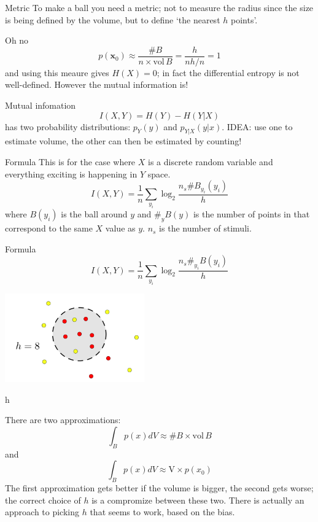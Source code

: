\documentclass{beamer}
\begin{document}
\begin{frame}{Metric}
To make a ball you need a metric; not to measure the radius since the
size is being defined by the volume, but to define \lq{}the nearest
$h$ points\rq{}.
\color{reddish}
\begin{center}
\color{reddish}

\end{center}
\end{frame}


\begin{frame}{Oh no}
\color{dark}
$$p(\mathbf{x}_0)\approx\frac{\#B}{n\times \mbox{vol}\,B}=\frac{h}{nh/n}=1$$
\color{black}
and using this meaure gives $H(X)=0$; in fact the
  differential entropy is not well-defined. However the
  mutual information is!
\end{frame}


\begin{frame}{Mutual infomation}
\color{dark}
$$I(X,Y)=H(Y)-H(Y|X)$$ 
\color{black}
has two probability distributions: $p_Y(y)$ and
  $p_{Y|X}(y|x)$.
\vskip 1cm
IDEA: use one to estimate volume, the other can then
  be estimated by counting!
\end{frame}

\begin{frame}{Formula}
This is for the case where $X$ is a discrete random variable and
everything exciting is happening in $Y$ space.
\color{dark}
$$I(X,Y)=\frac{1}{n}\sum_{y_i}\log_2{\frac{n_s\#B_{y_i}(y_i)}{h}}$$
\color{black} where $B(y_i)$ is the ball around $y$ and $\#_y{B(y)}$
  is the number of points in that correspond to the same $X$ value as
  $y$. $n_s$ is the number of stimuli.
\end{frame}


\begin{frame}{Formula}
\color{dark}
$$I(X,Y)=\frac{1}{n}\sum_{y_i}\log_2{\frac{n_s \#_{y_i}B(y_i)}{h}}$$
\color{black}
\begin{center}
\includegraphics[width=6cm]{dots.png}
\end{center}
\end{frame}


\begin{frame}{h}

  There are two approximations:
  \color{dark}
$$\int_B p(x)dV \approx \# B\times \mbox{vol}\,B$$
\color{black}
  and
\color{dark}
  $$\int_B p(x)dV \approx \mbox{V}\times p(x_0)$$ 
\color{black}
The first approximation gets better if the volume is bigger, the
second gets worse; the correct choice of $h$ is a compromize between
these two. There is actually an approach to picking $h$ that
seems to work, based on the bias.
\end{frame}
\end{document}
